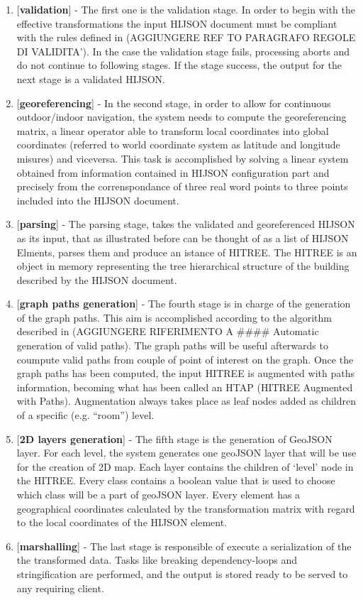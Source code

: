 \documentclass[]{article}
\begin{document}
\begin{enumerate}
\def\labelenumi{\arabic{enumi}.}
\itemsep1pt\parskip0pt
\item
  {[}\textbf{validation}{]} - The first one is the validation stage. In
  order to begin with the effective transformations the input HIJSON
  document must be compliant with the rules defined in (AGGIUNGERE REF
  TO PARAGRAFO REGOLE DI VALIDITA'). In the case the validation stage
  fails, processing aborts and do not continue to following stages. If
  the stage success, the output for the next stage is a validated
  HIJSON.
\item
  {[}\textbf{georeferencing}{]} - In the second stage, in order to allow
  for continuous outdoor/indoor navigation, the system needs to compute
  the georeferencing matrix, a linear operator able to transform local
  coordinates into global coordinates (referred to world coordinate
  system as latitude and longitude misures) and viceversa. This task is
  accomplished by solving a linear system obtained from information
  contained in HIJSON configuration part and precisely from the
  correnspondance of three real word points to three points included
  into the HIJSON document.
\item
  {[}\textbf{parsing}{]} - The parsing stage, takes the validated and
  georeferenced HIJSON as its input, that as illustrated before can be
  thought of as a list of HIJSON Elments, parses them and produce an
  istance of HITREE. The HITREE is an object in memory representing the
  tree hierarchical structure of the building described by the HIJSON
  document.
\item
  {[}\textbf{graph paths generation}{]} - The fourth stage is in charge
  of the generation of the graph paths. This aim is accomplished
  according to the algorithm described in (AGGIUNGERE RIFERIMENTO A
  \#\#\#\# Automatic generation of valid paths). The graph paths will be
  useful afterwards to coumpute valid paths from couple of point of
  interest on the graph. Once the graph paths has been computed, the
  input HITREE is augmented with paths information, becoming what has
  been called an HTAP (HITREE Augmented with Paths). Augmentation always
  takes place as leaf nodes added as children of a specific (e.g.
  ``room'') level.
\item
  {[}\textbf{2D layers generation}{]} - The fifth stage is the
  generation of GeoJSON layer. For each level, the system generates one
  geoJSON layer that will be use for the creation of 2D map. Each layer
  contains the children of `level' node in the HITREE. Every class
  contains a boolean value that is used to choose which class will be a
  part of geoJSON layer. Every element has a geographical coordinates
  calculated by the transformation matrix with regard to the local
  coordinates of the HIJSON element.
\item
  {[}\textbf{marshalling}{]} - The last stage is responsible of execute
  a serialization of the the transformed data. Tasks like breaking
  dependency-loops and stringification are performed, and the output is
  stored ready to be served to any requiring client.
\end{enumerate}
\end{document}
